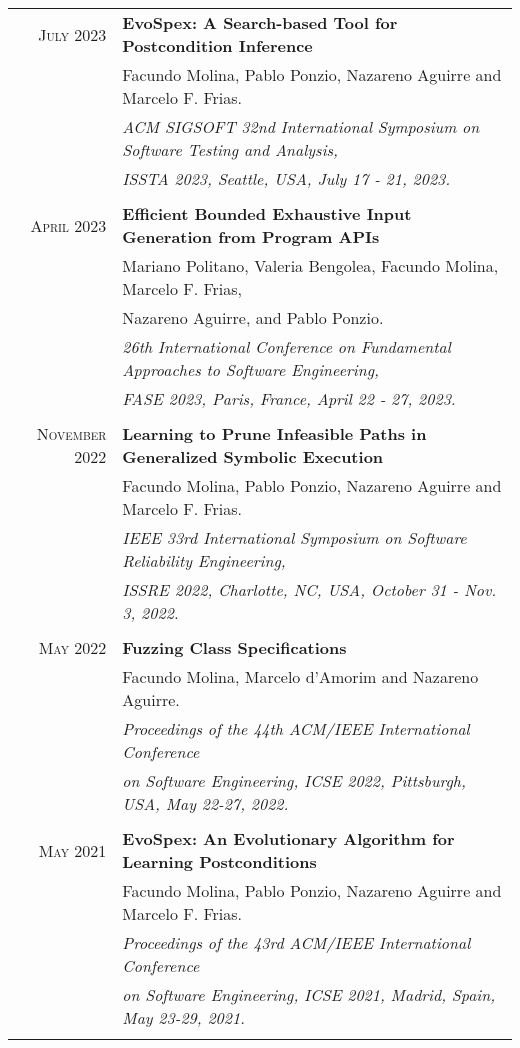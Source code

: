 \documentclass[a4paper,10pt]{article} %
\begin{document}
\begin{longtable}{rl}
\textsc{July} 2023  & \textbf{EvoSpex: A Search-based Tool for Postcondition Inference} \\
& Facundo Molina, Pablo Ponzio, Nazareno Aguirre and Marcelo F. Frias. \\
& \textit{ACM SIGSOFT 32nd International Symposium on Software Testing and Analysis,} \\
& \textit{ISSTA 2023, Seattle, USA, July 17 - 21, 2023.} \\ & \\

\textsc{April} 2023  & \textbf{Efficient Bounded Exhaustive Input Generation from Program APIs} \\
        & Mariano Politano, Valeria Bengolea, Facundo Molina, Marcelo F. Frias,\\
        & Nazareno Aguirre, and Pablo Ponzio. \\
	& \textit{26th International Conference on Fundamental Approaches to Software Engineering,} \\
        & \textit{FASE 2023, Paris, France, April 22 - 27, 2023.} \\ & \\

\textsc{November} 2022  & \textbf{Learning to Prune Infeasible Paths in Generalized Symbolic Execution} \\
        & Facundo Molina, Pablo Ponzio, Nazareno Aguirre and Marcelo F. Frias.\\
        & \textit{IEEE 33rd International Symposium on Software Reliability Engineering,} \\
        & \textit{ISSRE 2022, Charlotte, NC, USA, October 31 - Nov. 3, 2022.} \\ & \\

\textsc{May} 2022  & \textbf{Fuzzing Class Specifications} \\
	& Facundo Molina, Marcelo d'Amorim and Nazareno Aguirre. \\
	& \textit{Proceedings of the 44th ACM/IEEE International Conference} \\
	& \textit{on Software Engineering, ICSE 2022, Pittsburgh, USA, May 22-27, 2022.} \\ & \\

\textsc{May} 2021  & \textbf{EvoSpex: An Evolutionary Algorithm for Learning Postconditions} \\
& Facundo Molina, Pablo Ponzio, Nazareno Aguirre and Marcelo F. Frias. \\
& \textit{Proceedings of the 43rd ACM/IEEE International Conference} \\
& \textit{on Software Engineering, ICSE 2021, Madrid, Spain, May 23-29, 2021.} \\ & \\


\end{longtable}
\end{document}
